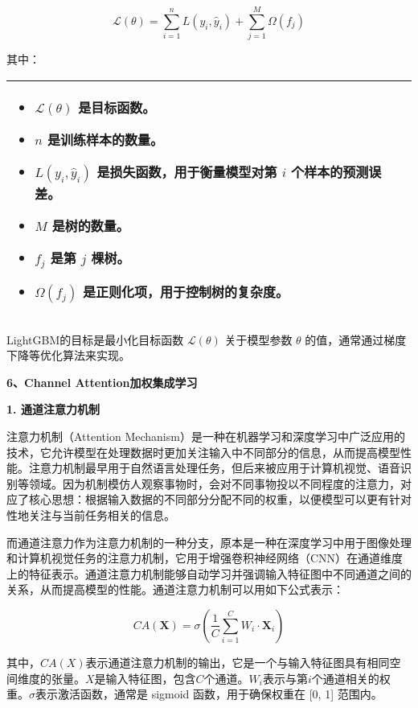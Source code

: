\documentclass[bwprint]{gmcmthesis}
\begin{document}
				\[
				\mathcal{L}(\theta) = \sum_{i=1}^{n} L(y_i, \hat{y}_i) + \sum_{j=1}^{M} \Omega(f_j)
				\]
				
				其中：
				
				\begin{table}[H]
					\centering
					\begin{tabularx}{\textwidth}{|X|}
						\hline
						\begin{itemize}
							\item $\mathcal{L}(\theta)$ 是目标函数。
							\item $n$ 是训练样本的数量。
							\item $L(y_i, \hat{y}_i)$ 是损失函数，用于衡量模型对第 $i$ 个样本的预测误差。
							\item $M$ 是树的数量。
							\item $f_j$ 是第 $j$ 棵树。
							\item $\Omega(f_j)$ 是正则化项，用于控制树的复杂度。
						\end{itemize}\\
						\hline
					\end{tabularx}
				\end{table}
				
				LightGBM的目标是最小化目标函数 $\mathcal{L}(\theta)$ 关于模型参数 $\theta$ 的值，通常通过梯度下降等优化算法来实现。
				
				\textbf{6、Channel Attention加权集成学习}
				
				\textbf{1. 通道注意力机制}
				
				注意力机制（Attention Mechanism）是一种在机器学习和深度学习中广泛应用的技术，它允许模型在处理数据时更加关注输入中不同部分的信息，从而提高模型性能。注意力机制最早用于自然语言处理任务，但后来被应用于计算机视觉、语音识别等领域。因为机制模仿人观察事物时，会对不同事物投以不同程度的注意力，对应了核心思想：根据输入数据的不同部分分配不同的权重，以便模型可以更有针对性地关注与当前任务相关的信息。
				
				而通道注意力作为注意力机制的一种分支，原本是一种在深度学习中用于图像处理和计算机视觉任务的注意力机制，它用于增强卷积神经网络（CNN）在通道维度上的特征表示。通道注意力机制能够自动学习并强调输入特征图中不同通道之间的关系，从而提高模型的性能。通道注意力机制可以用如下公式表示：
				
				\[
				CA(\mathbf{X})=\sigma\left(\frac1C\sum_{i=1}^CW_i\cdot\mathbf{X}_i\right)
				\]
				
				其中，$CA(X)$表示通道注意力机制的输出，它是一个与输入特征图具有相同空间维度的张量。$X$是输入特征图，包含$C$个通道。$W_i$表示与第$i$个通道相关的权重。$\sigma$表示激活函数，通常是 sigmoid 函数，用于确保权重在 [0, 1] 范围内。
				
\end{document}
